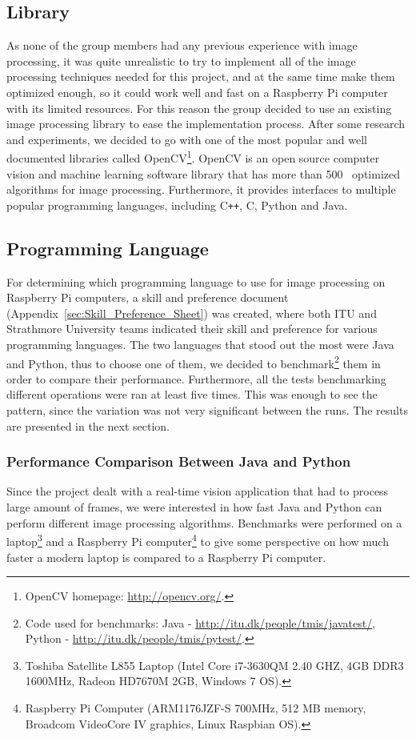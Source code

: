 
\subsection{Library}
As none of the group members had any previous experience with image processing, it was quite unrealistic to try to implement all of the image processing techniques needed for this project, and at the same time make them optimized enough, so it could work well and fast on a Raspberry Pi computer with its limited resources. For this reason the group decided to use an existing image processing library to ease the implementation process. After some research and experiments, we decided to go with one of the most popular and well documented libraries called OpenCV\footnote{OpenCV homepage: \url{http://opencv.org/}.}. OpenCV is an open source computer vision and machine learning software library that has more than 500~\cite{opencv_1} optimized algorithms for image processing. Furthermore, it provides interfaces to multiple popular programming languages, including C\texttt{++}, C, Python and Java.

\subsection{Programming Language}
For determining which programming language to use for image processing on Raspberry Pi computers, a skill and preference document (Appendix~\ref{sec:Skill_Preference_Sheet}) was created, where both ITU and Strathmore University teams indicated their skill and preference for various programming languages. The two languages that stood out the most were Java and Python, thus to choose one of them, we decided to benchmark\footnote{Code used for benchmarks: Java - \url{http://itu.dk/people/tmis/javatest/}, Python - \url{http://itu.dk/people/tmis/pytest/}.} them in order to compare their performance. Furthermore, all the tests benchmarking different operations were ran at least five times. This was enough to see the pattern, since the variation was not very significant between the runs. The results are presented in the next section.

\subsubsection{Performance Comparison Between Java and Python}
\label{sec:benchmark}
Since the project dealt with a real-time vision application that had to process large amount of frames, we were interested in how fast Java and Python can perform different image processing algorithms. Benchmarks were performed on a laptop\footnote{Toshiba Satellite L855 Laptop (Intel Core i7-3630QM 2.40 GHZ, 4GB DDR3 1600MHz, Radeon HD7670M 2GB, Windows 7 OS).} and a Raspberry Pi computer\footnote{Raspberry Pi Computer (ARM1176JZF-S 700MHz, 512 MB memory, Broadcom VideoCore IV graphics, Linux Raspbian OS).} to give some perspective on how much faster a modern laptop is compared to a Raspberry Pi computer.

